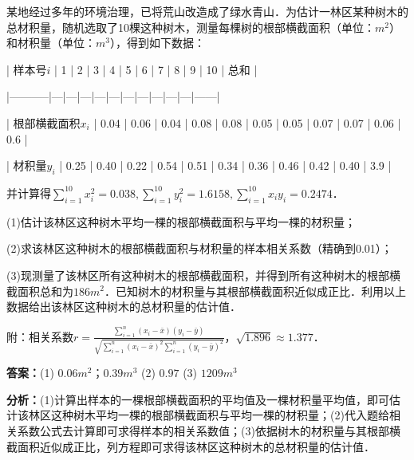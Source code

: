 \begin{question}[points=12]
某地经过多年的环境治理，已将荒山改造成了绿水青山．为估计一林区某种树木的总材积量，随机选取了10棵这种树木，测量每棵树的根部横截面积（单位：$m^2$）和材积量（单位：$m^3$），得到如下数据：



| 样本号$i$ | 1 | 2 | 3 | 4 | 5 | 6 | 7 | 8 | 9 | 10 | 总和 |

|-----------|---|---|---|---|---|---|---|---|---|---|------|

| 根部横截面积$x_i$ | 0.04 | 0.06 | 0.04 | 0.08 | 0.08 | 0.05 | 0.05 | 0.07 | 0.07 | 0.06 | 0.6 |

| 材积量$y_i$ | 0.25 | 0.40 | 0.22 | 0.54 | 0.51 | 0.34 | 0.36 | 0.46 | 0.42 | 0.40 | 3.9 |



并计算得$\sum\limits_{i=1}^{10} x_i^2 = 0.038, \sum\limits_{i=1}^{10} y_i^2 = 1.6158, \sum\limits_{i=1}^{10} x_i y_i = 0.2474$．

(1)估计该林区这种树木平均一棵的根部横截面积与平均一棵的材积量；

(2)求该林区这种树木的根部横截面积与材积量的样本相关系数（精确到0.01）；

(3)现测量了该林区所有这种树木的根部横截面积，并得到所有这种树木的根部横截面积总和为$186m^2$．已知树木的材积量与其根部横截面积近似成正比．利用以上数据给出该林区这种树木的总材积量的估计值．

附：相关系数$r=\frac{\sum\limits_{i=1}^n (x_i-\bar{x})(y_i-\bar{y})}{\sqrt{\sum\limits_{i=1}^n (x_i-\bar{x})^2 \sum\limits_{i=1}^n (y_i-\bar{y})^2}}$，$\sqrt{1.896} \approx 1.377$．
\begin{solution}
\textbf{答案：}(1) $0.06m^2$；$0.39m^3$
(2) $0.97$
(3) $1209m^3$

\textbf{分析：}(1)计算出样本的一棵根部横截面积的平均值及一棵材积量平均值，即可估计该林区这种树木平均一棵的根部横截面积与平均一棵的材积量；(2)代入题给相关系数公式去计算即可求得样本的相关系数值；(3)依据树木的材积量与其根部横截面积近似成正比，列方程即可求得该林区这种树木的总材积量的估计值．


\end{solution}
\end{question}

